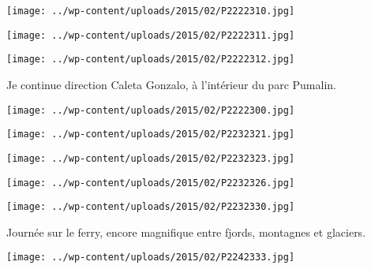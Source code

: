 \begin{center} \texttt{[image: ../wp-content/uploads/2015/02/P2222310.jpg]} \end{center}

 

\begin{center} \texttt{[image: ../wp-content/uploads/2015/02/P2222311.jpg]} \end{center}

 

\begin{center} \texttt{[image: ../wp-content/uploads/2015/02/P2222312.jpg]} \end{center}

Je continue direction Caleta Gonzalo, à l'intérieur du parc Pumalin.

 

\begin{center} \texttt{[image: ../wp-content/uploads/2015/02/P2222300.jpg]} \end{center}



 

\begin{center} \texttt{[image: ../wp-content/uploads/2015/02/P2232321.jpg]} \end{center}

 

\begin{center} \texttt{[image: ../wp-content/uploads/2015/02/P2232323.jpg]} \end{center}

 

\begin{center} \texttt{[image: ../wp-content/uploads/2015/02/P2232326.jpg]} \end{center}

 

\begin{center} \texttt{[image: ../wp-content/uploads/2015/02/P2232330.jpg]} \end{center}



 Journée sur le ferry, encore magnifique entre fjords, montagnes et glaciers.

\begin{center} \texttt{[image: ../wp-content/uploads/2015/02/P2242333.jpg]} \end{center}



